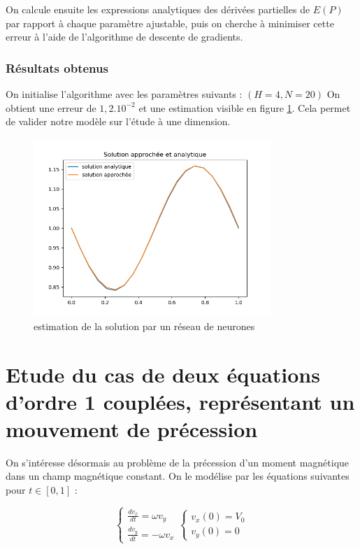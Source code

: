 \documentclass[]{article}
\begin{document}
On calcule ensuite les expressions analytiques des dérivées partielles de $E(P)$ par rapport à chaque paramètre ajustable, puis on cherche à minimiser cette erreur à l'aide de l'algorithme de descente de gradients.

\subsubsection{Résultats obtenus}
On initialise l'algorithme avec les paramètres suivants :
$(H=4, N=20)$
On obtient une erreur de $1,2.10^{-2}$ et une estimation visible en figure \ref{fig:resultat_NN}. Cela permet de valider notre modèle sur l'étude à une dimension.

\begin{figure}
\centering
\includegraphics[width=0.8\textwidth]{resultat_NN.png}
\caption{\label{fig:resultat_NN}estimation de la solution par un réseau de neurones}
\end{figure}

\section{Etude du cas de deux équations d'ordre 1 couplées, représentant un mouvement de précession}
\label{section_precession}
On s'intéresse désormais au problème de la précession d'un moment magnétique dans un champ magnétique constant. On le modélise par les équations suivantes pour $t\in [0,1]$ :

\begin{equation}
\left\{
    \begin{array}{ll}
        \frac{dv_x}{dt} = \omega v_y \\
        \frac{dv_y}{dt} = -\omega v_x
    \end{array}
\right.
\left\{
    \begin{array}{ll}
        v_x(0) = V_0 \\
        v_y(0) = 0
    \end{array}
\right.
\label{eq:équations couplées}
\end{equation}
\end{document}
